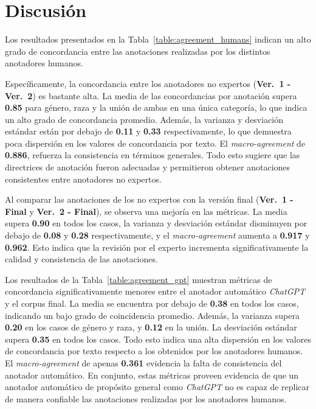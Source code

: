 \section{Discusi\'on}
Los resultados presentados en la Tabla~\ref{table:agreement_humans} indican un alto grado de concordancia entre las 
anotaciones realizadas por los distintos anotadores humanos.

Espec\'ificamente, la concordancia entre los anotadores no expertos (\textbf{Ver.~1 - Ver.~2}) es bastante alta. La
media de las concordancias por anotaci\'on supera \textbf{0.85} para g\'enero, raza y la uni\'on de ambas en una \'unica categor\'ia,
lo que indica un alto grado de concordancia promedio. Adem\'as, la varianza y desviaci\'on est\'andar est\'an por debajo de 
\textbf{0.11} y \textbf{0.33} respectivamente, lo que demuestra poca dispersi\'on en los valores de concordancia por texto. El
\emph{macro-agreement} de \textbf{0.886}, refuerza la consistencia en t\'erminos generales. Todo esto sugiere que las directrices 
de anotaci\'on fueron adecuadas y permitieron obtener anotaciones consistentes entre anotadores no expertos.

Al comparar las anotaciones de los no expertos con la versi\'on final (\textbf{Ver.~1 - Final} y \textbf{Ver.~2 - Final}), se
observa una mejor\'ia en las m\'etricas. La media supera \textbf{0.90} en todos los casos, la varianza y desviaci\'on est\'andar
disminuyen por debajo de \textbf{0.08} y \textbf{0.28} respectivamente, y el \emph{macro-agreement} aumenta a \textbf{0.917} y 
\textbf{0.962}. Esto indica que la revisi\'on por el experto incrementa significativamente la calidad y consistencia de las 
anotaciones.

Los resultados de la Tabla~\ref{table:agreement_gpt} muestran m\'etricas de concordancia significativamente menores entre 
el anotador autom\'atico \emph{ChatGPT} y el corpus final. La media se encuentra por debajo de \textbf{0.38} en todos los casos,
indicando un bajo grado de coincidencia promedio. Adem\'as, la varianza supera \textbf{0.20} en los casos de g\'enero y raza, y 
\textbf{0.12} en la uni\'on. La desviaci\'on est\'andar supera \textbf{0.35} en todos los casos. Todo esto indica una alta 
dispersi\'on en los valores de concordancia por texto respecto a los obtenidos por los anotadores humanos. El 
\emph{macro-agreement} de apenas \textbf{0.361} evidencia la falta de consistencia del anotador autom\'atico. En conjunto, estas
m\'etricas proveen evidencia de que un anotador autom\'atico de prop\'osito general como \emph{ChatGPT} no es capaz de replicar
de manera confiable las anotaciones realizadas por los anotadores humanos.  

